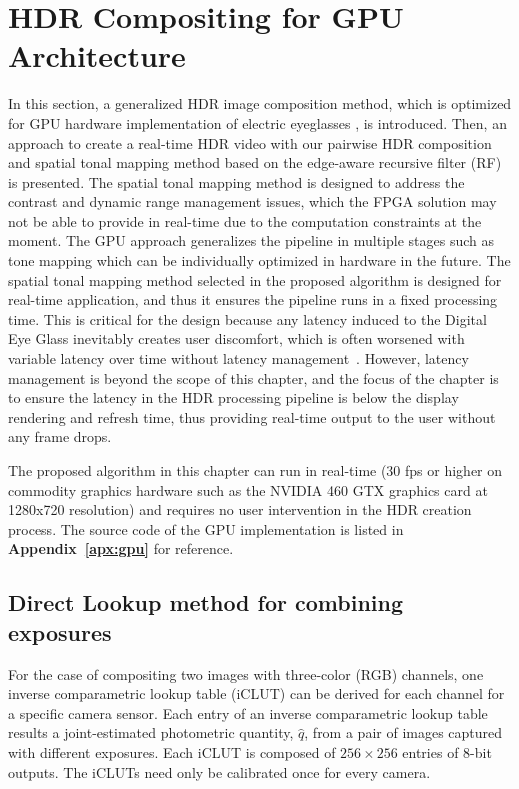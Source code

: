 \section{HDR Compositing for GPU Architecture}

In this section, a generalized HDR image composition method, which is optimized for GPU hardware 
implementation of electric eyeglasses \cite{mannist,robertson2003estimation,ali2012ICASSP}, is 
introduced. Then, an approach to create a real-time HDR video with our pairwise HDR composition 
and spatial tonal mapping method based on the edge-aware recursive filter 
(RF)~\cite{GastalOliveira2011DomainTransform} is presented. The spatial tonal mapping method is 
designed to address the contrast and dynamic range management issues, which the FPGA solution 
may not be able to provide in real-time due to the computation constraints at the moment. The GPU 
approach generalizes the pipeline in multiple stages such as tone mapping which can be individually 
optimized in hardware in the future. The spatial tonal mapping method selected in the proposed 
algorithm is designed for real-time application, and thus it ensures the pipeline runs in a fixed 
processing time. This is critical for the design because any latency induced to the Digital Eye Glass 
inevitably creates user discomfort, which is often worsened with variable latency over time without 
latency management~\cite{jacobs1997managing}. However, latency management is beyond the 
scope of this chapter, and the focus of the chapter is to ensure the latency in the HDR processing 
pipeline is below the display rendering and refresh time, thus providing real-time output to the user 
without any frame drops.

The proposed algorithm in this chapter can run in real-time (30 fps or higher on commodity graphics 
hardware such as the NVIDIA 460 GTX graphics card at 1280x720 resolution) and requires no user 
intervention in the HDR creation process.  The source code of the GPU implementation is listed in 
\textbf{Appendix~\ref{apx:gpu}} for reference. 

\subsection{Direct Lookup method for combining exposures} \label{comp_2_lut_2}
For the case of compositing two images with three-color (RGB) channels, one inverse comparametric 
lookup table (iCLUT) can be derived for each channel for a specific camera sensor. Each entry of an 
inverse comparametric lookup table results a joint-estimated photometric quantity, $\hat{q}$, from a 
pair of images captured with different exposures. Each iCLUT is composed of $256\times256$ 
entries of 8-bit outputs. The iCLUTs need only be calibrated once for every camera.

